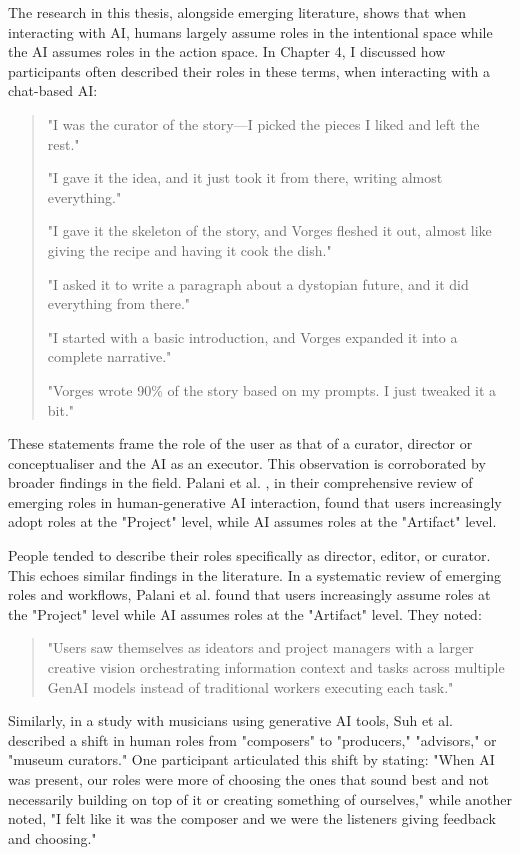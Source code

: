 The research in this thesis, alongside emerging literature, shows that when interacting
with AI, humans largely assume roles in the intentional space while the AI assumes roles
in the action space. In Chapter 4, I discussed how participants often described their roles in these terms, when interacting with a chat-based AI:

\begin{quote}
"I was the curator of the story—I picked the pieces I liked and left the rest."

"I gave it the idea, and it just took it from there, writing almost everything."

"I gave it the skeleton of the story, and Vorges fleshed it out, almost like giving the recipe and having it cook the dish."

"I asked it to write a paragraph about a dystopian future, and it did everything from there."

"I started with a basic introduction, and Vorges expanded it into a complete narrative."

"Vorges wrote 90\% of the story based on my prompts. I just tweaked it a bit."
\end{quote}

These statements frame the role of the user as that of a curator, director or conceptualiser and the AI as an executor. This observation is corroborated by broader findings in the field. Palani et al. \cite{Palani2024-on}, in their comprehensive review of emerging roles in human-generative AI interaction, found that users increasingly adopt roles at the "Project" level, while AI assumes roles at the "Artifact" level. 


People tended to describe their roles specifically as director, editor, or curator. This echoes
similar findings in the literature. In a systematic review of emerging roles and workflows,
Palani et al. \cite{Palani2024-on} found that users increasingly assume roles at
the "Project" level while AI assumes roles at the "Artifact" level. They noted:

\begin{quote}
    "Users saw themselves as ideators and project managers with a larger creative vision orchestrating information context and tasks across multiple GenAI models instead of traditional workers executing each task."
\end{quote}

Similarly, in a study with musicians using generative AI tools, Suh et al. \cite{Suh2021-cj} described a shift in human roles from "composers" to "producers," "advisors," or "museum curators." One participant articulated this shift by stating: "When AI was present, our roles were more of choosing the ones that sound best and not necessarily building on top of it or creating something of ourselves," while another noted, "I felt like it was the composer and we were the listeners giving feedback and choosing."

